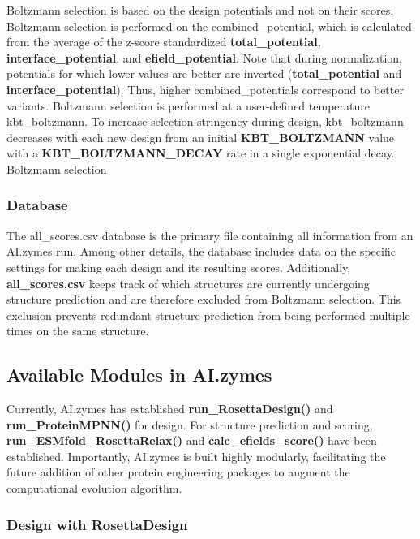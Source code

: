 \documentclass[10pt]{extarticle}
\begin{document}
Boltzmann selection is based on the design potentials and not on their scores. Boltzmann selection is performed on the combined\_potential, which is calculated from the average of the z-score standardized \textbf{total\_potential}, \textbf{interface\_potential}, and \textbf{efield\_potential}. Note that during normalization, potentials for which lower values are better are inverted (\textbf{total\_potential} and \textbf{interface\_potential}). Thus, higher combined\_potentials correspond to better variants. Boltzmann selection is performed at a user-defined temperature kbt\_boltzmann. To increase selection stringency during design, kbt\_boltzmann decreases with each new design from an initial \textbf{KBT\_BOLTZMANN} value with a \textbf{KBT\_BOLTZMANN\_DECAY} rate in a single exponential decay.
Boltzmann selection

\subsubsection{Database}

The all\_scores.csv database is the primary file containing all information from an AI.zymes run. Among other details, the database includes data on the specific settings for making each design and its resulting scores. Additionally, \textbf{all\_scores.csv} keeps track of which structures are currently undergoing structure prediction and are therefore excluded from Boltzmann selection. This exclusion prevents redundant structure prediction from being performed multiple times on the same structure.

\subsection{Available Modules in AI.zymes}

Currently, AI.zymes has established \textbf{run\_RosettaDesign()} and \textbf{run\_ProteinMPNN()} for design. For structure prediction and scoring, \textbf{run\_ESMfold\_RosettaRelax()} and \textbf{calc\_efields\_score()} have been established. Importantly, AI.zymes is built highly modularly, facilitating the future addition of other protein engineering packages to augment the computational evolution algorithm.

\subsubsection{Design with RosettaDesign}
\end{document}
